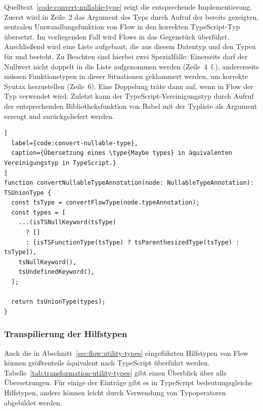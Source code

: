 Quelltext~\ref{code:convert-nullable-type} zeigt die entsprechende Implementierung. Zuerst wird in Zeile~2 das Argument des Typs  durch Aufruf der bereits gezeigten, zentralen Umwandlungsfunktion von Flow in den korrekten TypeScript-Typ übersetzt. Im vorliegenden Fall wird Flows  in das Gegenstück  überführt. Anschließend wird eine Liste aufgebaut, die aus diesem Datentyp und den Typen für  und  besteht. Zu Beachten sind hierbei zwei Spezialfälle: Einerseits darf der Nullwert nicht doppelt in die Liste aufgenommen werden (Zeile~4~f.), andererseits müssen Funktionstypen in dieser Situationen geklammert werden, um korrekte Syntax herzustellen (Zeile~6). Eine Doppelung träte dann auf, wenn in Flow der Typ  verwendet wird. Zuletzt kann der TypeScript-Vereinigungstyp durch Aufruf der entsprechenden Bibliotheksfunktion von Babel mit der Typliste als Argument erzeugt und zurückgeliefert werden.

\begin{lstlisting}[
  label={code:convert-nullable-type},
  caption={Übersetzung eines \type{Maybe types} in äquivalenten Vereinigungstyp in TypeScript.}
]
function convertNullableTypeAnnotation(node: NullableTypeAnnotation): TSUnionType {
  const tsType = convertFlowType(node.typeAnnotation);
  const types = [
    ...(isTSNullKeyword(tsType)
      ? []
      : [isTSFunctionType(tsType) ? tsParenthesizedType(tsType) : tsType]),
    tsNullKeyword(),
    tsUndefinedKeyword(),
  ];

  return tsUnionType(types);
}
\end{lstlisting}

\subsubsection{Transpilierung der Hilfstypen}

Auch die in Abschnitt~\ref{sec:flow:utility-types} eingeführten Hilfstypen von Flow können größtenteils äquivalent nach TypeScript überführt werden. Tabelle~\ref{tab:transformation-utility-types} gibt einen Überblick über alle Übersetzungen. Für einige der Einträge gibt es in TypeScript bedeutungsgleiche Hilfstypen, andere können leicht durch Verwendung von Typoperatoren abgebildet werden.



